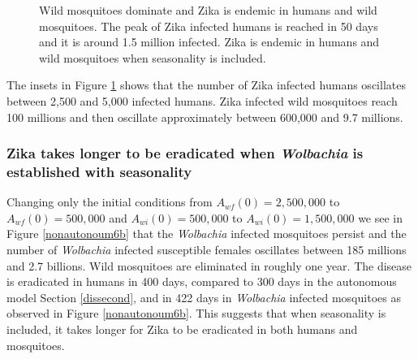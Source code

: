 \documentclass{ws-rv9x6}
\begin{document}

\begin{figure}[H]
    \centering
    
    \makebox[0pt][l]{}%
    \makebox[0pt][l]{}%
    \caption{Wild mosquitoes dominate and Zika is endemic in humans and wild mosquitoes. The peak of Zika  infected  humans is reached in  50  days  and it is around 1.5  million infected. Zika is endemic in humans and wild mosquitoes when seasonality is included.}
    \label{fig:new6a}
\end{figure}



The insets in Figure \ref{fig:new6a} shows that the number of Zika infected humans oscillates between 2,500 and 5,000 infected humans. Zika infected wild mosquitoes reach 100 millions and then oscillate approximately between 600,000 and 9.7 millions.

\subsubsection{ Zika takes longer to be eradicated when \textit{Wolbachia} is established with seasonality}
Changing only the initial conditions from $A_{wf}(0)= 2,500,000$ to $A_{wf}(0)=500,000$ and $A_{wi}(0)=500,000$ to $A_{wi}(0)=1,500,000$ we see in Figure \ref{nonautonoum6b} that the \textit{Wolbachia} infected mosquitoes persist and the number of \textit{Wolbachia} infected susceptible females oscillates between 185 millions and 2.7 billions. Wild mosquitoes are eliminated in roughly one year. The disease is eradicated in humans in 400 days, compared to 300 days in the autonomous model Section \ref{dissecond}, and in 422 days in \textit{Wolbachia} infected mosquitoes as observed in Figure \ref{nonautonoum6b}. This suggests that when seasonality is included, it takes longer for Zika to be eradicated in both humans and mosquitoes.
\end{document}
